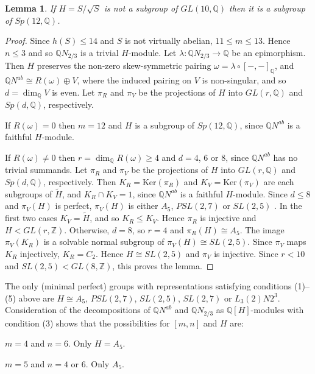 \documentclass[12pt]{amsart}
\renewcommand{\geq}{\geqslant}
\renewcommand{\leq}{\leqslant}
\newtheorem{lemma}[theorem]{Lemma}
\begin{document}
\begin{lemma}
\label{Sp12}
If $H=S/\sqrt{S}$ is not a subgroup of $GL(10,\mathbb{Q})$ then 
it is a subgroup of $Sp(12,\mathbb{Q})$.
\end{lemma}

\begin{proof}
Since $h(S)\leq14$ and $S$ is not virtually abelian, 
$11\leq{m}\leq13$.
Hence $n\leq3$ and so  $\mathbb{Q}N_{2/3}$ is a trivial $H$-module.
Let $\lambda:\mathbb{Q}N_{2/3}\to\mathbb{Q}$ be an epimorphism.
Then $H$ preserves the non-zero skew-symmetric pairing 
$\omega=\lambda\circ[-,-]_\mathbb{Q}$,
and $\mathbb{Q}N^{ab}\cong{R(\omega)\oplus{V}}$,
where the induced pairing on $V$ is non-singular,
and so $d=\dim_\mathbb{Q}V$ is even.
Let $\pi_R$ and $\pi_V$ be the projections of $H$ into $GL(r,\mathbb{Q})$ and 
$Sp(d,\mathbb{Q})$, respectively.

If $R(\omega)=0$ then $m=12$ and $H$ is a subgroup of $Sp(12,\mathbb{Q})$,
since $\mathbb{Q}N^{ab}$ is a faithful $H$-module.

If $R(\omega)\not=0$ then $r=\dim_\mathbb{Q}R(\omega)\geq4$ and $d=4$,  
6 or 8,  since $\mathbb{Q}N^{ab}$ has no trivial summands.
Let $\pi_R$ and $\pi_V$ be the projections of $H$ into $GL(r,\mathbb{Q})$ and 
$Sp(d,\mathbb{Q})$, respectively.
Then $K_R=\mathrm{Ker}(\pi_R)$ and $K_V=\mathrm{Ker}(\pi_V)$ 
are each subgroups of $\widetilde{H}$,  
and $K_R\cap{K_V}=1$,
since $\mathbb{Q}N^{ab}$ is a faithful $H$-module.
Since $d\leq8$ and $\pi_V(H)$ is perfect,
$\pi_V(H)$ is either $A_5$, $PSL(2,7)$ or $SL(2,5)$ \cite{Ki}.
In the first two cases $K_V=\widetilde{H}$,
and so $K_R\leq{K_V}$.
Hence $\pi_R$ is injective and $H<GL(r,\mathbb{Z})$.
Otherwise,  $d=8$, so $r=4$ and $\pi_R(H)\cong{A_5}$.
The image $\pi_V(K_R)$ is a solvable normal subgroup of $\pi_V(H)\cong{SL(2,5)}$.
Since $\pi_V$ maps $K_R$ injectively, $K_R=C_2$.
Hence $H\cong{SL(2,5)}$ and $\pi_V$ is injective.
Since $r<10$ and $SL(2,5)<GL(8,\mathbb{Z})$, this proves the lemma.
\end{proof}

The only (minimal perfect) groups with representations satisfying conditions (1)--(5) 
above are $H\cong{A_5}$,  $PSL(2,7)$,  $SL(2,5)$, $SL(2,7)$ or $L_3(2)N2^3$.
Consideration of the decompositions of $\mathbb{Q}N^{ab}$ and 
$\mathbb{Q}N_{2/3}$ as $\mathbb{Q}[H]$-modules with condition (3) 
shows that the possibilities for $[m,n]$ and $H$ are:

$m=4$ and $n=6$. Only $H=A_5$.

$m=5$ and $n=4$ or 6. Only $A_5$.
\end{document}
